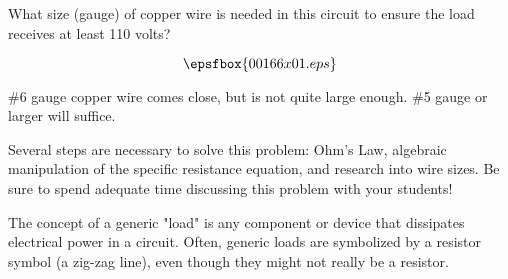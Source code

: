 

What size (gauge) of copper wire is needed in this circuit to ensure the load receives at least 110 volts?

$$\epsfbox{00166x01.eps}$$







\#6 gauge copper wire comes close, but is not quite large enough.  \#5 gauge or larger will suffice.







Several steps are necessary to solve this problem: Ohm's Law, algebraic manipulation of the specific resistance equation, and research into wire sizes.  Be sure to spend adequate time discussing this problem with your students!

The concept of a generic "load" is any component or device that dissipates electrical power in a circuit.  Often, generic loads are symbolized by a resistor symbol (a zig-zag line), even though they might not really be a resistor.




